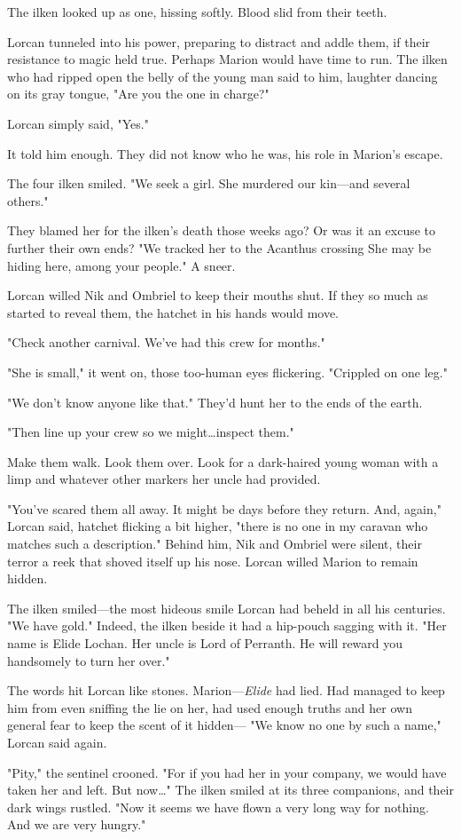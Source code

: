 The ilken looked up as one, hissing softly.
Blood slid from their teeth.

Lorcan tunneled into his power, preparing to distract and addle them, if their resistance to magic held true.
Perhaps Marion would have time to run.
The ilken who had ripped open the belly of the young man said to him, laughter dancing on its gray tongue, "Are you the one in charge?"

Lorcan simply said, "Yes."

It told him enough.
They did not know who he was, his role in Marion's escape.

The four ilken smiled.
"We seek a girl.
She murdered our kin---and several others."

They blamed her for the ilken's death those weeks ago?
Or was it an excuse to further their own ends?
"We tracked her to the Acanthus crossing  She may be hiding here, among your people."
A sneer.

Lorcan willed Nik and Ombriel to keep their mouths shut.
If they so much as started to reveal them, the hatchet in his hands would move.

"Check another carnival.
We've had this crew for months."

"She is small," it went on, those too-human eyes flickering.
"Crippled on one leg."

"We don't know anyone like that."
They'd hunt her to the ends of the earth.

"Then line up your crew so we might\ldots inspect them."

Make them walk.
Look them over.
Look for a dark-haired young woman with a limp and whatever other markers her uncle had provided.

"You've scared them all away.
It might be days before they return.
And, again," Lorcan said, hatchet flicking a bit higher, "there is no one in my caravan who matches such a description."
Behind him, Nik and Ombriel were silent, their terror a reek that shoved itself up his nose.
Lorcan willed Marion to remain hidden.

The ilken smiled---the most hideous smile Lorcan had beheld in all his centuries.
"We have gold."
Indeed, the ilken beside it had a hip-pouch sagging with it.
"Her name is Elide Lochan.
Her uncle is Lord of Perranth.
He will reward you handsomely to turn her over."

The words hit Lorcan like stones.
Marion---\emph{Elide} had 
lied.
Had managed to keep him from even sniffing the lie on her, had used enough truths and her own general fear to keep the scent of it hidden--- "We know no one by such a name," Lorcan said again.

"Pity," the sentinel crooned.
"For if you had her in your company, we would have taken her and left.
But now\ldots" The ilken smiled at its three companions, and their dark wings rustled.
"Now it seems we have flown a very long way for nothing.
And we are very hungry."
